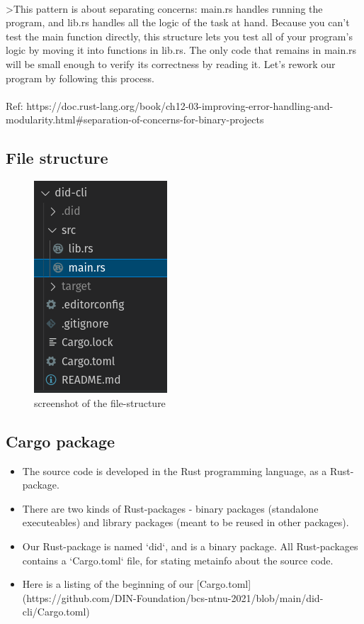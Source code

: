 \paragraph{}
>This pattern is about separating concerns: main.rs handles running the program, and lib.rs handles all the logic of the task at hand. Because you can’t test the main function directly, this structure lets you test all of your program’s logic by moving it into functions in lib.rs. The only code that remains in main.rs will be small enough to verify its correctness by reading it. Let’s rework our program by following this process.

\paragraph{}
Ref: https://doc.rust-lang.org/book/ch12-03-improving-error-handling-and-modularity.html\#separation-of-concerns-for-binary-projects


\subsection{File structure}


    \begin{figure}[htbp]
      \centering
      \includegraphics[width=.3\textwidth]{figures/code-organization.png}
      \caption[]{screenshot of the file-structure}
    \end{figure}

\subsection{Cargo package}

\begin{itemize}
    \item The source code is developed in the Rust programming language, as a Rust-package.
    \item There are two kinds of Rust-packages - binary packages (standalone executeables) and library packages (meant to be reused in other packages).
    \item Our Rust-package is named `did`, and is a binary package.
     All Rust-packages contains a `Cargo.toml` file, for stating metainfo about the source code.
    \item Here is a listing of the beginning of our [Cargo.toml](https://github.com/DIN-Foundation/bcs-ntnu-2021/blob/main/did-cli/Cargo.toml)
\end{itemize}
    
